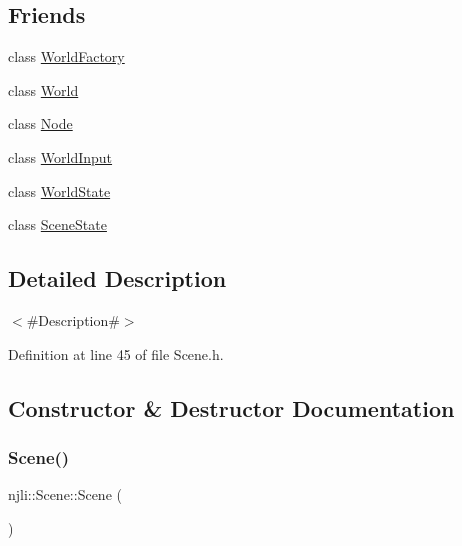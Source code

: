 \subsection*{Friends}
\begin{DoxyCompactItemize}
\item 
class \mbox{\hyperlink{classnjli_1_1_scene_acb96ebb09abe8f2a37a915a842babfac}{World\+Factory}}
\item 
class \mbox{\hyperlink{classnjli_1_1_scene_a7b4bcdf992c21ae83363f25df05b1d25}{World}}
\item 
class \mbox{\hyperlink{classnjli_1_1_scene_a6db9d28bd448a131448276ee03de1e6d}{Node}}
\item 
class \mbox{\hyperlink{classnjli_1_1_scene_a5a2020205bbce2fe559331689dd5d3c4}{World\+Input}}
\item 
class \mbox{\hyperlink{classnjli_1_1_scene_a59cdb6fe5b378389e35b8b2a2f4e990e}{World\+State}}
\item 
class \mbox{\hyperlink{classnjli_1_1_scene_ace13a6b81a7cce08dd6f9d0c1c00af04}{Scene\+State}}
\end{DoxyCompactItemize}


\subsection{Detailed Description}
$<$\#\+Description\#$>$ 

Definition at line 45 of file Scene.\+h.



\subsection{Constructor \& Destructor Documentation}
\mbox{\label{classnjli_1_1_scene_af5b5f627027c8c24f6a9eb27c1cb1dbf}} 
\subsubsection{\texorpdfstring{Scene()}{Scene()}\hspace{0.1cm}{\footnotesize\ttfamily [1/3]}}
{\footnotesize\ttfamily njli\+::\+Scene\+::\+Scene (\begin{DoxyParamCaption}{ }\end{DoxyParamCaption})\hspace{0.3cm}{\ttfamily [protected]}}

